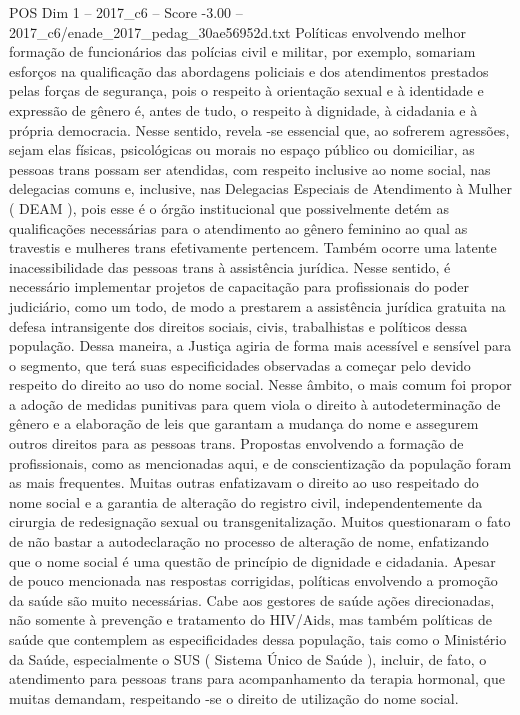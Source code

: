 \begin{textsample}{POS Dim 1 – 2017\_c6 – Score -3.00 – 2017\_c6/enade\_2017\_pedag\_30ae56952d.txt}
Políticas envolvendo melhor formação de funcionários das polícias civil e militar, por exemplo, somariam esforços na qualificação das abordagens policiais e dos atendimentos prestados pelas forças de segurança, pois o respeito à orientação sexual e à identidade e expressão de gênero é, antes de tudo, o respeito à dignidade, à cidadania e à própria democracia.
Nesse sentido, revela -se essencial que, ao sofrerem agressões, sejam elas físicas, psicológicas ou morais no espaço público ou domiciliar, as pessoas trans possam ser atendidas, com respeito inclusive ao nome social, nas delegacias comuns e, inclusive, nas Delegacias Especiais de Atendimento à Mulher ( DEAM ), pois esse é o órgão institucional que possivelmente detém as qualificações necessárias para o atendimento ao gênero feminino ao qual as travestis e mulheres trans efetivamente pertencem.
Também ocorre uma latente inacessibilidade das pessoas trans à assistência jurídica.
Nesse sentido, é necessário implementar projetos de capacitação para profissionais do poder judiciário, como um todo, de modo a prestarem a assistência jurídica gratuita na defesa intransigente dos direitos sociais, civis, trabalhistas e políticos dessa população.
Dessa maneira, a Justiça agiria de forma mais acessível e sensível para o segmento, que terá suas especificidades observadas a começar pelo devido respeito do direito ao uso do nome social.
Nesse âmbito, o mais comum foi propor a adoção de medidas punitivas para quem viola o direito à autodeterminação de gênero e a elaboração de leis que garantam a mudança do nome e assegurem outros direitos para as pessoas trans.
Propostas envolvendo a formação de profissionais, como as mencionadas aqui, e de conscientização da população foram as mais frequentes.
Muitas outras enfatizavam o direito ao uso respeitado do nome social e a garantia de alteração do registro civil, independentemente da cirurgia de redesignação sexual ou transgenitalização.
Muitos questionaram o fato de não bastar a autodeclaração no processo de alteração de nome, enfatizando que o nome social é uma questão de princípio de dignidade e cidadania.
Apesar de pouco mencionada nas respostas corrigidas, políticas envolvendo a promoção da saúde são muito necessárias.
Cabe aos gestores de saúde ações direcionadas, não somente à prevenção e tratamento do HIV/Aids, mas também políticas de saúde que contemplem as especificidades dessa população, tais como o Ministério da Saúde, especialmente o SUS ( Sistema Único de Saúde ), incluir, de fato, o atendimento para pessoas trans para acompanhamento da terapia hormonal, que muitas demandam, respeitando -se o direito de utilização do nome social.

\end{textsample}
